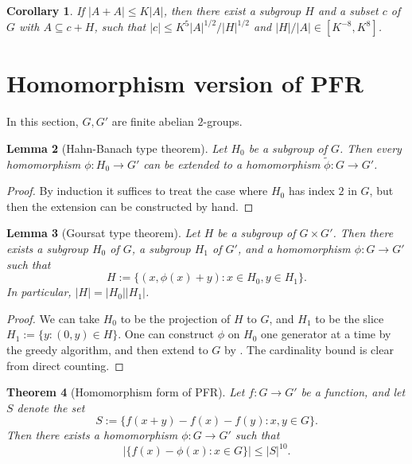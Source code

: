 \documentclass[10pt,a4paper]{article}
\newtheorem{theorem}{Theorem}
\newtheorem{lemma}[theorem]{Lemma}
\newtheorem{corollary}[theorem]{Corollary}
\newcommand{\lean}[1]{}
\newcommand{\uses}[1]{}
\newcommand{\leanok}{}
\newcommand{\chapter}[1]{\section{#1}}
\begin{document}
\begin{corollary}\label{pfr-9-aux'}\lean{better_PFR_conjecture_aux}\leanok
If $|A+A| \leq K|A|$, then there exist a subgroup $H$ and a subset $c$ of $G$
with $A \subseteq c + H$, such that $|c| \leq K^{5} |A|^{1/2}/|H|^{1/2}$ and
$|H|/|A|\in[K^{-8},K^8]$.
\end{corollary}

\chapter{Homomorphism version of PFR}

In this section, $G, G'$ are finite abelian $2$-groups.

\begin{lemma}[Hahn-Banach type theorem]\label{hb-thm}\lean{hahn_banach}\leanok  Let $H_0$ be a subgroup of $G$.  Then every homomorphism $\phi: H_0 \to G'$ can be extended to a homomorphism $\tilde \phi: G \to G'$.
\end{lemma}

\begin{proof}\leanok  By induction it suffices to treat the case where $H_0$ has index $2$ in $G$, but then the extension can be constructed by hand.
\end{proof}

\begin{lemma}[Goursat type theorem]\label{goursat}\lean{goursat}\leanok  Let $H$ be a subgroup of $G \times G'$.  Then there exists a subgroup $H_0$ of $G$, a subgroup $H_1$ of $G'$, and a homomorphism $\phi: G \to G'$ such that
$$ H := \{ (x, \phi(x) + y): x \in H_0, y \in H_1 \}.$$
In particular, $|H| = |H_0| |H_1|$.
\end{lemma}

\begin{proof}\uses{hb-thm}\leanok We can take $H_0$ to be the projection of $H$ to $G$, and $H_1$ to be the slice $H_1 := \{ y: (0,y) \in H \}$.  One can construct $\phi$ on $H_0$ one generator at a time by the greedy algorithm, and then extend to $G$ by .  The cardinality bound is clear from direct counting.
\end{proof}

\begin{theorem}[Homomorphism form of PFR]\label{hom-pfr}\lean{homomorphism_pfr}\leanok  Let $f: G \to G'$ be a function, and let $S$ denote the set
$$ S := \{ f(x+y)-f(x)-f(y): x,y \in G \}.$$
Then there exists a homomorphism $\phi: G \to G'$ such that
$$ |\{ f(x) - \phi(x): x \in G \}| \leq |S|^{10}.$$
\end{theorem}
\end{document}

